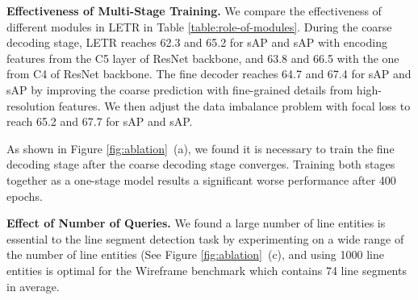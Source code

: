 \documentclass[final]{cvpr}
\begin{document}
\begin{table}[h]
    \centering
    \vspace{-2mm}
    \caption{\textbf{Comparison with object detection baselines} on Wireframe~\cite{huang2018learning}.}
    \label{tab:compare-object-detection}

    \vspace{-1mm}
\end{table}

\noindent\textbf{Effectiveness of Multi-Stage Training.}
We compare the effectiveness of different modules in LETR in Table \ref{table:role-of-modules}. During the coarse decoding stage, LETR reaches 62.3 and 65.2 for sAP and sAP with encoding features from the C5 layer of ResNet backbone, and 63.8 and 66.5 with the one from C4 of ResNet backbone. The fine decoder reaches 64.7 and 67.4 for sAP and sAP by improving the coarse prediction with fine-grained details from high-resolution features. We then adjust the data imbalance problem with focal loss to reach 65.2 and 67.7 for sAP and sAP. 

As shown in Figure \ref{fig:ablation}~(a), we found it is necessary to train the fine decoding stage after the coarse decoding stage converges. Training both stages together as a one-stage model results a significant worse performance after 400 epochs. 

\noindent\textbf{Effect of Number of Queries.}
We found a large number of line entities is essential to the line segment detection task by experimenting on a wide range of the number of line entities (See Figure \ref{fig:ablation}~(c), and using 1000 line entities is optimal for the Wireframe benchmark which contains 74 line segments in average.
\end{document}
